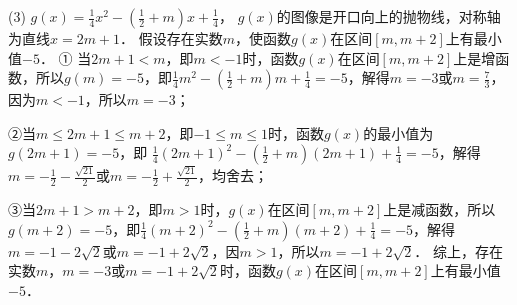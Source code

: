 \documentclass[cs4size,windows,a4paper,answers]{BHCexam}
\begin{document}
\begin{groups}
\begin{questions}[s]
\begin{solution}
(3) $g(x)=\frac{1}{4}{{x}^{2}}-\left( \frac{1}{2}+m \right)x+\frac{1}{4}$，         
$g(x)$的图像是开口向上的抛物线，对称轴为直线$x=2m+1$．
假设存在实数$m$，使函数$g(x)$在区间$[m,m+2]$上有最小值$-5$．
①	当$2m+1<m$，即$m<-1$时，函数$g(x)$在区间$[m,m+2]$上是增函数，所以$g(m)=-5$，即$\frac{1}{4}{{m}^{2}}-\left( \frac{1}{2}+m \right)m+\frac{1}{4}=-5$，解得$m=-3$或$m=\frac{7}{3}$，
因为$m<-1$，所以$m=-3$；

②当$m\le 2m+1\le m+2$，即$-1\le m\le 1$时，函数$g(x)$的最小值为$g(2m+1)=-5$，即
$\frac{1}{4}{{(2m+1)}^{2}}-\left( \frac{1}{2}+m \right)(2m+1)+\frac{1}{4}=-5$，解得$m=-\frac{1}{2}-\frac{\sqrt{21}}{2}$或$m=-\frac{1}{2}+\frac{\sqrt{21}}{2}$，均舍去；

③当$2m+1>m+2$，即$m>1$时，$g(x)$在区间$[m,m+2]$上是减函数，所以$g(m+2)=-5$，即$\frac{1}{4}{{(m+2)}^{2}}-\left( \frac{1}{2}+m \right)(m+2)+\frac{1}{4}=-5$，解得$m=-1-2\sqrt{2}$或$m=-1+2\sqrt{2}$，因$m>1$，所以$m=-1+2\sqrt{2}$．
综上，存在实数$m$，$m=-3$或$m=-1+2\sqrt{2}$时，函数$g(x)$在区间$[m,m+2]$上有最小值$-5$． 
\end{solution}
\end{questions}
\end{groups}
\end{document}

